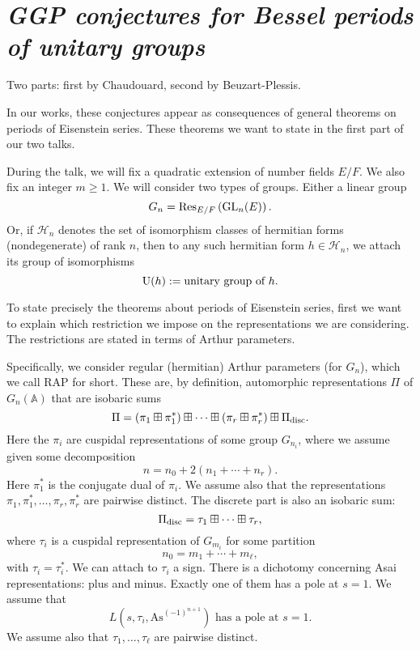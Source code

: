 \documentclass[reqno]{amsart} 
\begin{document}
\section{\emph{GGP conjectures for Bessel periods of unitary groups}}
Two parts: first by Chaudouard, second by Beuzart-Plessis.

In our works, these conjectures appear as consequences of general theorems on periods of Eisenstein series.  These theorems we want to state in the first part of our two talks.

During the talk, we will fix a quadratic extension of number fields $E/F$.  We also fix an integer $m \geq 1$.  We will consider two types of groups.  Either a linear group
\begin{equation*}
G_n = \operatorname{Res}_{E/F} \left( \operatorname{GL}_n (E) \right).
\end{equation*}
Or, if $\mathcal{H}_n$ denotes the set of isomorphism classes of hermitian forms (nondegenerate) of rank $n$, then to any such hermitian form $h \in \mathcal{H}_n$, we attach its group of isomorphisms
\begin{equation*}
\operatorname{U}(h) := \text{unitary group of } h.
\end{equation*}

To state precisely the theorems about periods of Eisenstein series, first we want to explain which restriction we impose on the representations we are considering.  The restrictions are stated in terms of Arthur parameters.

Specifically, we consider regular (hermitian) Arthur parameters (for $G_n$), which we call RAP for short.  These are, by definition, automorphic representations $\Pi$ of $G_n(\mathbb{A})$ that are isobaric sums
\begin{equation*}
  \Pi = \left( \pi_1 \boxplus \pi_1^\ast  \right) \boxplus \dotsb \boxplus
  \left( \pi_r \boxplus \pi_r^\ast  \right) \boxplus \Pi_{\operatorname{disc}}.
\end{equation*}
Here the $\pi_i $ are cuspidal representations of some group $G_{n_i}$, where we assume given some decomposition
\begin{equation*}
n = n_0 + 2 (n_1 + \dotsb + n_r ).
\end{equation*}
Here $\pi_1^\ast $ is the conjugate dual of $\pi_i $.  We assume also that the representations $\pi_1 , \pi_1^\ast, \dotsc, \pi_r, \pi_r^\ast $ are pairwise distinct.  The discrete part is also an isobaric sum:
\begin{equation*}
\Pi_{\operatorname{disc}} = \tau_1 \boxplus \dotsb \boxplus \tau_r,
\end{equation*}
where $\tau_i $ is a cuspidal representation of $G_{m_i }$ for some partition
\begin{equation*}
n_0 = m_1 + \dotsb + m_{\ell} ,
\end{equation*}
with $\tau_i = \tau_i^\ast$.  We can attach to $\tau_i $ a sign.  There is a dichotomy concerning Asai representations: plus and minus.  Exactly one of them has a pole at $s = 1$.  We assume that
\begin{equation*}
L (s, \tau_i, \mathrm{As}^{(- 1 )^{n + 1}}) \text{ has a pole at } s = 1.
\end{equation*}
We assume also that $\tau_1, \dotsc, \tau_{\ell} $ are pairwise distinct.
\end{document}
